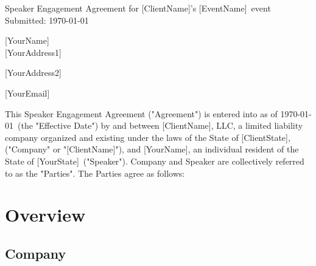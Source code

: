 \documentclass[a4paper,12pt]{article} %
\newcommand{\YourName}{[YourName]}
\newcommand{\AddressLineOne}{[YourAddress1]}
\newcommand{\AddressLineTwo}{[YourAddress2]}
\newcommand{\YourEmail}{[YourEmail]}
\newcommand{\YourState}{[YourState]}
\newcommand{\ClientName}{[ClientName]}
\newcommand{\ClientState}{[ClientState]}
\newcommand{\EventName}{[EventName]}
\begin{document}

\begin{titlepage}

\vspace*{\fill} %

\begin{center}

{\LARGE Speaker Engagement Agreement for \ClientName's \EventName  ~event}\\ [1.5cm]

Submitted: \today

\end{center}

\YourName\\

\AddressLineOne

\AddressLineTwo

\YourEmail

\vspace*{\fill} %

\end{titlepage}


This Speaker Engagement Agreement ("Agreement") is entered into as of \today ~(the "Effective Date") by and between \ClientName, LLC, a limited liability company organized and existing under the laws of the State of \ClientState, ("Company" or "\ClientName"), and \YourName, an individual resident of the State of \YourState ~("Speaker"). Company and Speaker are collectively referred to as the "Parties". The Parties agree as follows:


\section{Overview}

\subsection{Company}
\end{document}
